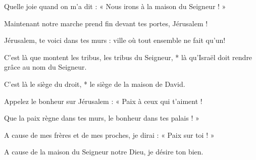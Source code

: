 \item Quelle joie quand on m'a dit : « Nous irons à la maison du Seigneur ! »

\item Maintenant notre marche prend fin devant tes portes, Jérusalem !

\item Jérusalem, te voici dans tes murs : ville où tout ensemble ne fait qu'un!

\item C'est là que montent les tribus, les tribus du Seigneur, * là qu'Israël doit rendre grâce au nom du Seigneur.

\item C'est là le siège du droit, * le siège de la maison de David.

\item Appelez le bonheur sur Jérusalem : « Paix à ceux qui t'aiment !

\item Que la paix règne dans tes murs, le bonheur dans tes palais ! »

\item A cause de mes frères et de mes proches, je dirai : « Paix sur toi ! »

\item A cause de la maison du Seigneur notre Dieu, je désire ton bien.
